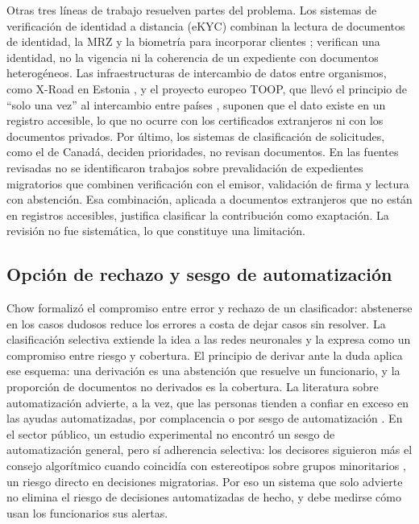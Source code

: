 \documentclass[11pt,a4paper]{article}
\begin{document}
Otras tres líneas de trabajo resuelven partes del problema. Los sistemas de verificación de identidad a distancia (eKYC) combinan la lectura de documentos de identidad, la MRZ y la biometría para incorporar clientes \cite{das2026}; verifican una identidad, no la vigencia ni la coherencia de un expediente con documentos heterogéneos. Las infraestructuras de intercambio de datos entre organismos, como X-Road en Estonia \cite{xroad}, y el proyecto europeo TOOP, que llevó el principio de ``solo una vez'' al intercambio entre países \cite{toop2021}, suponen que el dato existe en un registro accesible, lo que no ocurre con los certificados extranjeros ni con los documentos privados. Por último, los sistemas de clasificación de solicitudes, como el de Canadá, deciden prioridades, no revisan documentos. En las fuentes revisadas no se identificaron trabajos sobre prevalidación de expedientes migratorios que combinen verificación con el emisor, validación de firma y lectura con abstención. Esa combinación, aplicada a documentos extranjeros que no están en registros accesibles, justifica clasificar la contribución como exaptación. La revisión no fue sistemática, lo que constituye una limitación.

\subsection{Opción de rechazo y sesgo de automatización}
Chow \cite{chow1970} formalizó el compromiso entre error y rechazo de un clasificador: abstenerse en los casos dudosos reduce los errores a costa de dejar casos sin resolver. La clasificación selectiva \cite{geifman2017} extiende la idea a las redes neuronales y la expresa como un compromiso entre riesgo y cobertura. El principio de derivar ante la duda aplica ese esquema: una derivación es una abstención que resuelve un funcionario, y la proporción de documentos no derivados es la cobertura. La literatura sobre automatización advierte, a la vez, que las personas tienden a confiar en exceso en las ayudas automatizadas, por complacencia o por sesgo de automatización \cite{parasuraman2010}. En el sector público, un estudio experimental no encontró un sesgo de automatización general, pero sí adherencia selectiva: los decisores siguieron más el consejo algorítmico cuando coincidía con estereotipos sobre grupos minoritarios \cite{alonbarkat2023}, un riesgo directo en decisiones migratorias. Por eso un sistema que solo advierte no elimina el riesgo de decisiones automatizadas de hecho, y debe medirse cómo usan los funcionarios sus alertas.
\end{document}
